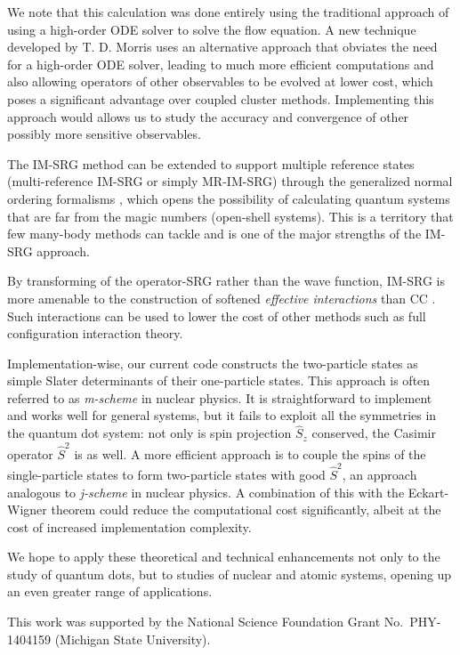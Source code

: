 We note that this calculation was done entirely using the traditional approach of using a high-order ODE solver to solve the flow equation.  A new technique developed by T. D. Morris \cite{PhysRevC.92.034331} uses an alternative approach that obviates the need for a high-order ODE solver, leading to much more efficient computations and also allowing operators of other observables to be evolved at lower cost, which poses a significant advantage over coupled cluster methods.  Implementing this approach would allows us to study the accuracy and convergence of other possibly more sensitive observables.

The IM-SRG method can be extended to support multiple reference states (multi-reference IM-SRG or simply MR-IM-SRG) \cite{PhysRevLett.110.242501,PhysRevC.90.041302} through the generalized normal ordering formalisms \cite{doi:10.1063/1.474405}, which opens the possibility of calculating quantum systems that are far from the magic numbers (open-shell systems).  This is a territory that few many-body methods can tackle and is one of the major strengths of the IM-SRG approach.

By transforming of the operator-SRG rather than the wave function, IM-SRG is more amenable to the construction of softened \textit{effective interactions} than CC \cite{Hergert2016165}.  Such interactions can be used to lower the cost of other methods such as full configuration interaction theory.

Implementation-wise, our current code constructs the two-particle states as simple Slater determinants of their one-particle states.  This approach is often referred to as \textit{m-scheme} in nuclear physics.  It is straightforward to implement and works well for general systems, but it fails to exploit all the symmetries in the quantum dot system: not only is spin projection $\hat S_z$ conserved, the Casimir operator $\hat S^2$ is as well.  A more efficient approach is to couple the spins of the single-particle states to form two-particle states with good $\hat S^2$, an approach analogous to \textit{j-scheme} in nuclear physics.  A combination of this with the Eckart-Wigner theorem could reduce the computational cost significantly, albeit at the cost of increased implementation complexity.


We hope to apply these theoretical and technical enhancements not only to the study of quantum dots, but to studies of nuclear and atomic systems, opening up an even greater range of applications.

\begin{acknowledgments}
  This work was supported by the National Science Foundation Grant No.\ PHY-1404159 (Michigan State University).
\end{acknowledgments}




